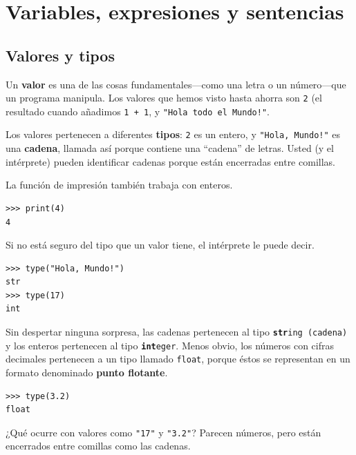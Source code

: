 \chapter{Variables, expresiones y sentencias}

\section{Valores y tipos}

  

Un \textbf{valor} es una de las cosas fundamentales—como una letra
o un número—que un programa manipula. Los valores que hemos visto
hasta ahorra son \texttt{2} (el resultado cuando añadimos \texttt{1
+ 1}, y {\verb+"Hola todo el Mundo!"+}.

Los valores pertenecen a diferentes \textbf{tipos}: \texttt{2} es
un entero, y {\verb+"Hola, Mundo!"+} es una \textbf{cadena}, llamada
así porque contiene una ``cadena'' de letras. Usted (y el intérprete)
pueden identificar cadenas porque están encerradas entre comillas.

La función de impresión también trabaja con enteros.

\begin{verbatim}
>>> print(4)
4
\end{verbatim}


Si no está seguro del tipo que un valor tiene, el intérprete le puede
decir.

\begin{verbatim}
>>> type("Hola, Mundo!")
str
>>> type(17)
int
\end{verbatim}


Sin despertar ninguna sorpresa, las cadenas pertenecen al tipo \texttt{\textbf{str}}\texttt{ing
(cadena)} y los enteros pertenecen al tipo \texttt{\textbf{int}}\texttt{eger}.
Menos obvio, los números con cifras decimales pertenecen a un tipo
llamado \texttt{float}, porque éstos se representan en un formato
denominado \textbf{punto flotante}.

    
 

\begin{verbatim}
>>> type(3.2)
float
\end{verbatim}

¿Qué ocurre con valores como {\verb+"17"+} y {\verb+"3.2"+}?
Parecen números, pero están encerrados entre comillas como las cadenas.

